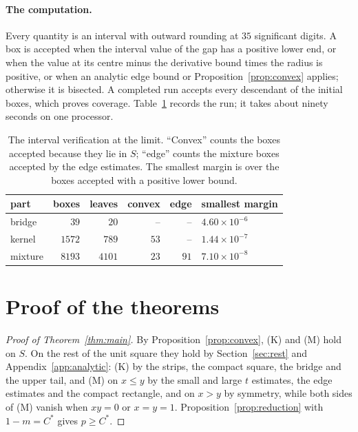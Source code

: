 \documentclass[aps,prd,twocolumn,superscriptaddress,nofootinbib,longbibliography,floatfix,amsmath,amssymb,10pt]{revtex4-2}
\theoremstyle{plain}
\theoremstyle{definition}
\theoremstyle{plain}
\newcommand{\Cs}{C^{*}}
\begin{document}
\paragraph*{The computation.} Every quantity is an interval with outward rounding at $35$ significant digits. A box is accepted when the interval value of the gap has a positive lower end, or when the value at its centre minus the derivative bound times the radius is positive, or when an analytic edge bound or Proposition~\ref{prop:convex} applies; otherwise it is bisected. A completed run accepts every descendant of the initial boxes, which proves coverage. Table~\ref{tab:run} records the run; it takes about ninety seconds on one processor.

\begin{table}[t]
\centering
\caption{The interval verification at the limit. ``Convex'' counts the boxes accepted because they lie in $S$; ``edge'' counts the mixture boxes accepted by the edge estimates. The smallest margin is over the boxes accepted with a positive lower bound.}
\label{tab:run}
\begin{tabular}{lrrrrl}
\toprule
part & boxes & leaves & convex & edge & smallest margin\\
\midrule
bridge & $39$ & $20$ & -- & -- & $4.60\times10^{-6}$\\
kernel & $1572$ & $789$ & $53$ & -- & $1.44\times10^{-7}$\\
mixture & $8193$ & $4101$ & $23$ & $91$ & $7.10\times10^{-8}$\\
\bottomrule
\end{tabular}
\end{table}

\section{Proof of the theorems}\label{sec:proofs}

\begin{proof}[Proof of Theorem~\ref{thm:main}]
By Proposition~\ref{prop:convex}, (K) and (M) hold on $S$. On the rest of the unit square they hold by Section~\ref{sec:rest} and Appendix~\ref{app:analytic}: (K) by the strips, the compact square, the bridge and the upper tail, and (M) on $x\le y$ by the small and large $t$ estimates, the edge estimates and the compact rectangle, and on $x>y$ by symmetry, while both sides of (M) vanish when $xy=0$ or $x=y=1$. Proposition~\ref{prop:reduction} with $1-m=\Cs$ gives $p\ge\Cs$.
\end{proof}
\end{document}
